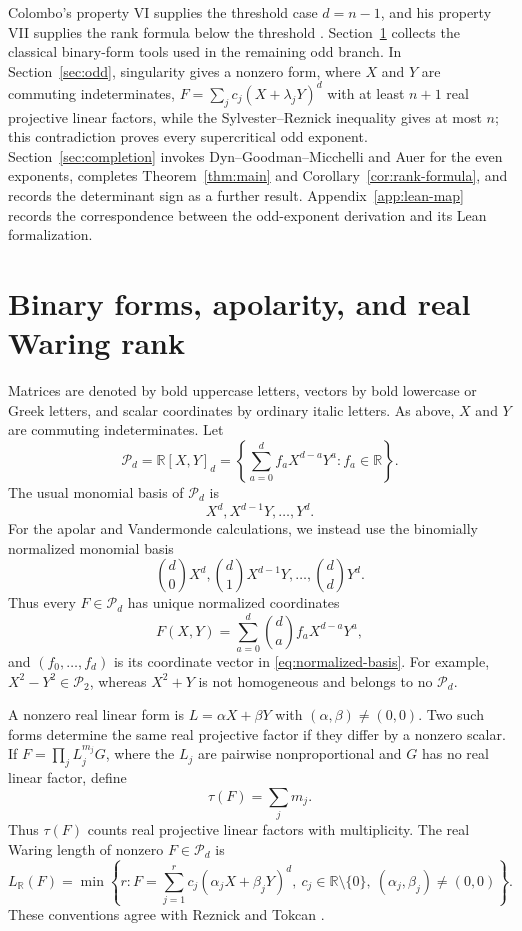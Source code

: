 \documentclass[11pt,letterpaper,reqno]{amsart}
\numberwithin{equation}{section}
\theoremstyle{definition}
\newcommand{\RR}{\mathbb{R}}
\newcommand{\cP}{\mathcal{P}}
\newcommand{\LR}{L_{\RR}}
\begin{document}
Colombo's property VI supplies the threshold case \(d=n-1\), and his
property VII supplies the rank formula below the threshold
\cite[pp.~35--36]{Colombo1928}.  Section~\ref{sec:apolar} collects the
classical binary-form tools used in the remaining odd branch.  In
Section~\ref{sec:odd}, singularity gives a nonzero form, where \(X\) and
\(Y\) are commuting indeterminates,
\(F=\sum_jc_j(X+\lambda_jY)^d\) with at least \(n+1\) real projective
linear factors, while the Sylvester--Reznick inequality gives at most
\(n\); this contradiction proves every supercritical odd exponent.
Section~\ref{sec:completion} invokes Dyn--Goodman--Micchelli and Auer for
the even exponents, completes Theorem~\ref{thm:main} and
Corollary~\ref{cor:rank-formula}, and records the determinant sign as a
further result.  Appendix~\ref{app:lean-map} records the correspondence
between the odd-exponent derivation and its Lean formalization.

\section{Binary forms, apolarity, and real Waring rank}
\label{sec:apolar}

Matrices are denoted by bold uppercase letters, vectors by bold lowercase
or Greek letters, and scalar coordinates by ordinary italic letters.
As above, \(X\) and \(Y\) are commuting indeterminates.  Let
\begin{equation}\label{eq:binary-form-space}
 \cP_d=\RR[X,Y]_d
 =\left\{\sum_{a=0}^d f_aX^{d-a}Y^a:f_a\in\RR\right\}.
\end{equation}
The usual monomial basis of \(\cP_d\) is
\[
 X^d,X^{d-1}Y,\ldots,Y^d.
\]
For the apolar and Vandermonde calculations, we instead use the
binomially normalized monomial basis
\begin{equation}\label{eq:normalized-basis}
 \binom d0X^d,\binom d1X^{d-1}Y,\ldots,\binom ddY^d.
\end{equation}
Thus every \(F\in\cP_d\) has unique normalized coordinates
\[
 F(X,Y)=\sum_{a=0}^d\binom da f_aX^{d-a}Y^a,
\]
and \((f_0,\ldots,f_d)\) is its coordinate vector in
\eqref{eq:normalized-basis}.  For example,
\(X^2-Y^2\in\cP_2\), whereas \(X^2+Y\) is not homogeneous and belongs
to no \(\cP_d\).

A nonzero real linear form is \(L=\alpha X+\beta Y\) with
\((\alpha,\beta)\ne(0,0)\).  Two such forms determine the same real
projective factor if they differ by a nonzero scalar.  If
\(F=\prod_jL_j^{m_j}G\), where the \(L_j\) are pairwise
nonproportional and \(G\) has no real linear factor, define
\begin{equation}\label{eq:tau-definition}
 \tau(F)=\sum_jm_j.
\end{equation}
Thus \(\tau(F)\) counts real projective linear factors with
multiplicity.  The real Waring length of nonzero \(F\in\cP_d\) is
\begin{equation}\label{eq:real-waring-length}
 \LR(F)=\min\left\{
 r:F=\sum_{j=1}^r c_j(\alpha_jX+\beta_jY)^d,
 \ c_j\in\RR\setminus\{0\},\ (\alpha_j,\beta_j)\ne(0,0)
 \right\}.
\end{equation}
These conventions agree with Reznick \cite[\S1]{Reznick2013} and
Tokcan \cite[Introduction]{Tokcan2017}.
\end{document}
